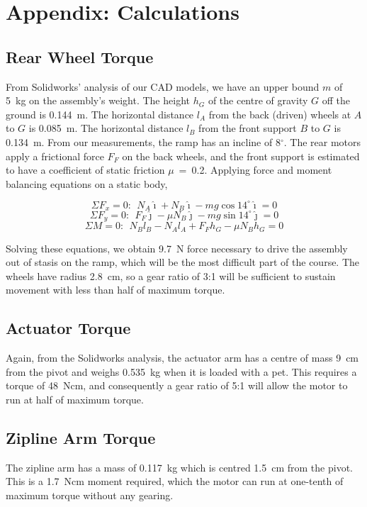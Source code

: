 \appendix
\newpage
\section{Appendix: Calculations}
\label{AppendixA}

	\subsection{Rear Wheel Torque}
	From Solidworks' analysis of our CAD models, we have an upper bound $m$ of 5~kg on the assembly's weight. The height $h_G$ of the centre of gravity $G$ off the ground is 0.144~m. The horizontal distance $l_A$ from the back (driven) wheels at $A$ to $G$ is 0.085~m. The horizontal distance $l_B$ from the front support $B$ to $G$ is 0.134~m. From our measurements, the ramp has an incline of 8$^\circ$. The rear motors apply a frictional force $F_F$ on the back wheels, and the front support is estimated to have a coefficient of static friction $\mu$~=~0.2. Applying force and moment balancing equations on a static body,
	
	$$\Sigma F_x = 0:~~ N_A\hat{\imath} + N_B\hat{\imath} - mg\cos{14^\circ}\hat{\imath} = 0$$
	$$\Sigma F_y = 0:~~ F_F\hat{\jmath} - \mu N_B\hat{\jmath}  - mg\sin{14^\circ}\hat{\jmath} = 0$$
	$$\Sigma M = 0:~~ N_Bl_B - N_Al_A + F_Fh_G - \mu N_Bh_G= 0$$
	
	Solving these equations, we obtain 9.7~N force necessary to drive the assembly out of stasis on the ramp, which will be the most difficult part of the course. The wheels have radius 2.8~cm, so a gear ratio of 3:1 will be sufficient to sustain movement with less than half of maximum torque.
	
	\subsection{Actuator Torque}
	Again, from the Solidworks analysis, the actuator arm has a centre of mass 9~cm from the pivot and weighs 0.535~kg when it is loaded with a pet. This requires a torque of 48~Ncm, and consequently a gear ratio of 5:1 will allow the motor to run at half of maximum torque.
	
	\subsection{Zipline Arm Torque}
	The zipline arm has a mass of 0.117~kg which is centred 1.5~cm from the pivot. This is a 1.7~Ncm moment required, which the motor can run at one-tenth of maximum torque without any gearing.
	
